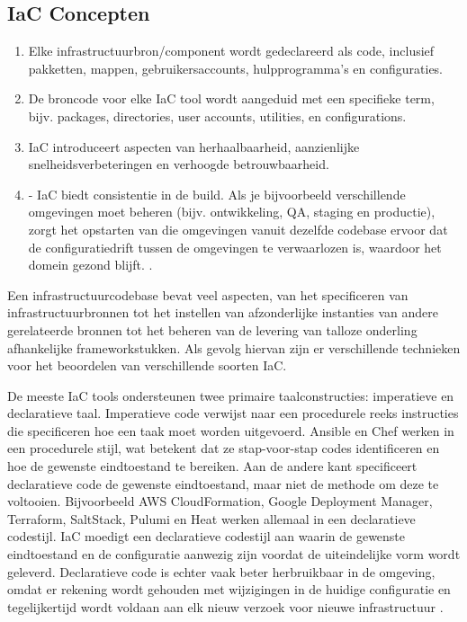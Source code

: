 \subsection{IaC Concepten}
\label{IaC Concepten}
\begin{enumerate}
    \item Elke infrastructuurbron/component wordt gedeclareerd als code, inclusief pakketten, mappen, gebruikersaccounts, hulpprogramma's en configuraties. 
    \item De broncode voor elke IaC tool wordt aangeduid met een specifieke term, bijv. packages, directories, user accounts, utilities, en configurations.
    \item IaC introduceert aspecten van herhaalbaarheid, aanzienlijke snelheidsverbeteringen en verhoogde betrouwbaarheid.
    \item -	IaC biedt consistentie in de build. Als je bijvoorbeeld verschillende omgevingen moet beheren (bijv. ontwikkeling, QA, staging en productie), zorgt het opstarten van die omgevingen vanuit dezelfde codebase ervoor dat de configuratiedrift tussen de omgevingen te verwaarlozen is, waardoor het domein gezond blijft.
    \autocite{Achar2021}.
\end{enumerate}

\label{Soorten IaC}
Een infrastructuurcodebase bevat veel aspecten, van het specificeren van infrastructuurbronnen tot het instellen van afzonderlijke instanties van andere gerelateerde bronnen tot het beheren van de levering van talloze onderling afhankelijke frameworkstukken.  Als gevolg hiervan zijn er verschillende technieken voor het beoordelen van verschillende soorten IaC.
\par
De meeste IaC tools ondersteunen twee primaire taalconstructies: imperatieve en declaratieve taal. Imperatieve code verwijst naar een procedurele reeks instructies die specificeren hoe een taak moet worden uitgevoerd. Ansible en Chef werken in een procedurele stijl, wat betekent dat ze stap-voor-stap codes identificeren en hoe de gewenste eindtoestand te bereiken. Aan de andere kant specificeert declaratieve code de gewenste eindtoestand, maar niet de methode om deze te voltooien. Bijvoorbeeld AWS CloudFormation, Google Deployment Manager, Terraform, SaltStack, Pulumi en Heat werken allemaal in een declaratieve codestijl. IaC moedigt een declaratieve codestijl aan waarin de gewenste eindtoestand en de configuratie aanwezig zijn voordat de uiteindelijke vorm wordt geleverd.  Declaratieve code is echter vaak beter herbruikbaar in de omgeving, omdat er rekening wordt gehouden met wijzigingen in de huidige configuratie en tegelijkertijd wordt voldaan aan elk nieuw verzoek voor nieuwe infrastructuur \autocite{Achar2021}.

